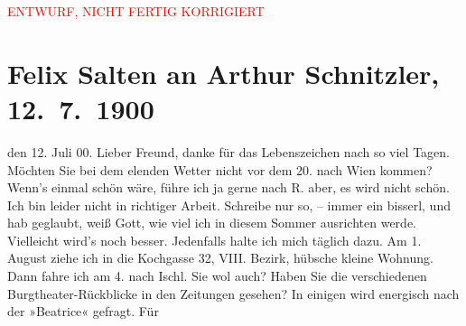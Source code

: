 
\begin{center}
            \textcolor{red}{ENTWURF, NICHT FERTIG KORRIGIERT}
                      \end{center}
            
         
         \renewcommand{\erwaehntePersonen}{Personen: Paul Schlenther}
         \renewcommand{\erwaehnteInstitutionen}{Institutionen: Burgtheater}
         \renewcommand{\erwaehnteOrte}{Orte: Bad Ischl, Kochgasse, Reichenau an der Rax, Wien}
         \renewcommand{\erwaehnteWerke}{Werke: Der Schleier der Beatrice. Schauspiel in fünf Akten}
               \section[Felix Salten an Arthur Schnitzler, 12. 7. 1900]{ Felix Salten an Arthur Schnitzler, 12. 7. 1900}\nopagebreak{}\rehead{ }\begin{ledgroupsized}[t]{13cm}\normalsize\beginnumbering \toendnotes[C]{\smallbreak\pagebreak[2]} 
\toendnotes[C]{\smallbreak}\pstart
           \raggedleft{}{\pb}den
                     12. Juli 00. \pend
           \pstart
           Lieber Freund, danke für das Lebenszeichen nach so viel Tagen.
               Möchten Sie bei dem elenden Wetter nicht vor dem 20. nach Wien kommen? Wenn’s einmal schön wäre, führe ich ja
               gerne nach R. aber, es wird nicht schön. Ich bin
               leider nicht in richtiger Arbeit. Schreibe nur so, – immer ein bisserl, und hab
               geglaubt, weiß Gott, wie viel ich in diesem Sommer ausrichten werde. Vielleicht
               wird's noch besser. Jedenfalls halte ich mich täglich dazu. Am 1. August
               ziehe ich in die Kochgasse 32, VIII. Bezirk,
               hübsche kleine Wohnung. Dann fahre ich am 4. nach Ischl. Sie wol auch? Haben Sie die verschiedenen Burgtheater-Rückblicke in den Zeitungen gesehen? In einigen
               wird energisch nach der »Beatrice« gefragt. Für

\end{ledgroupsized}
